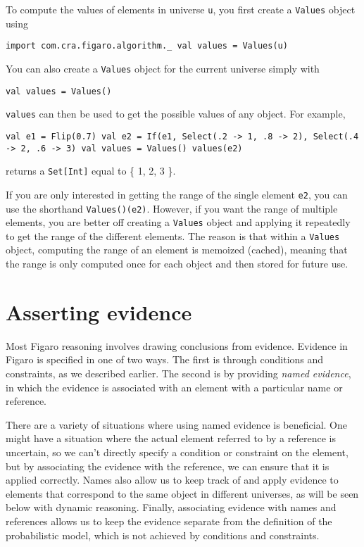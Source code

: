 To compute the values of elements in universe \texttt{u}, you first create a \texttt{Values} object using

\begin{flushleft}
\texttt{import com.cra.figaro.algorithm.\_
\newline val values = Values(u)}
\end{flushleft}

You can also create a \texttt{Values} object for the current universe simply with

\begin{flushleft}
\texttt{val values = Values()}
\end{flushleft}

\texttt{values} can then be used to get the possible values of any object. For example,

\begin{flushleft}
\texttt{val e1 = Flip(0.7)
\newline val e2 = If(e1, Select(.2 -> 1, .8 -> 2), Select(.4 -> 2, .6 -> 3)
\newline val values = Values()
\newline values(e2)}
\end{flushleft}

returns a \texttt{Set[Int]} equal to \{ 1, 2, 3 \}.

If you are only interested in getting the range of the single element \texttt{e2}, you can use the shorthand \texttt{Values()(e2)}. However, if you want the range of multiple elements, you are better off creating a \texttt{Values} object and applying it repeatedly to get the range of the different elements. The reason is that within a \texttt{Values} object, computing the range of an element is memoized (cached), meaning that the range is only computed once for each object and then stored for future use.

\section{Asserting evidence}

Most Figaro reasoning involves drawing conclusions from evidence. Evidence in Figaro is specified in one of two ways. The first is through conditions and constraints, as we described earlier. The second is by providing \emph{named evidence}, in which the evidence is associated with an element with a particular name or reference.

There are a variety of situations where using named evidence is beneficial. One might have a situation where the actual element referred to by a reference is uncertain, so we can't directly specify a condition or constraint on the element, but by associating the evidence with the reference, we can ensure that it is applied correctly. Names also allow us to keep track of and apply evidence to elements that correspond to the same object in different universes, as will be seen below with dynamic reasoning. Finally, associating evidence with names and references allows us to keep the evidence separate from the definition of the probabilistic model, which is not achieved by conditions and constraints.

